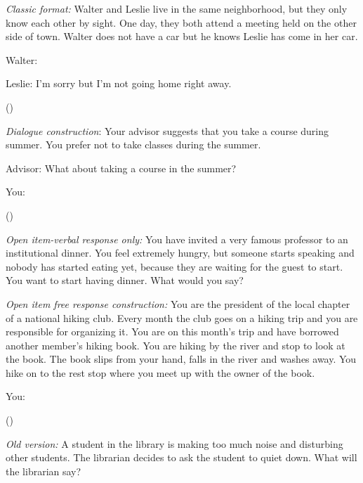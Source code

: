 \documentclass[output=paper]{LSP/langsci}
\begin{document}
\ea
    \label{ex:van:1}
\textit{Classic format:} Walter and Leslie live in the same neighborhood, but they only know each other by sight. One day, they both attend a meeting held on the other side of town. Walter does not have a car but he knows Leslie has come in her car.


Walter: {\longrule\longrule\longrule\longrule\longrule\longrule\longrule}

Leslie: I’m sorry but I’m not going home right away.

  (\citealt{BlumKulka1989})
\z

\ea%
    \label{ex:van:2}
 

          \textit{Dialogue construction}: Your advisor suggests that you take a course during summer. You prefer not to take classes during the summer. 

Advisor: What about taking a course in the summer?

You: {\longrule\longrule\longrule\longrule\longrule\longrule\longrule}

(\citealt{Bardovi-Harlig1993})

    \z
\ea%
    \label{ex:van:3} 
          \textit{Open item-verbal response only:} You have invited a very famous professor to an institutional dinner. You feel extremely hungry, but someone starts speaking and nobody has started eating yet, because they are waiting for the guest to start. You want to start having dinner. What would you say?

\citep{Safont-Jorda2003}

    \z

\ea%
    \label{ex:van:4} 
          \textit{Open item free response construction:} You are the president of the local chapter of a national hiking club. Every month the club goes on a hiking trip and you are responsible for organizing it. You are on this month’s trip and have borrowed another member’s hiking book. You are hiking by the river and stop to look at the book. The book slips from your hand, falls in the river and washes away. You hike on to the rest stop where you meet up with the owner of the book.

You: {\longrule\longrule\longrule\longrule\longrule\longrule\longrule}

(\citealt{Hudson1995})
    \z


\ea%
    \label{ex:van:5} 

          \textit{Old version:} A student in the library is making too much noise and disturbing other students. The librarian decides to ask the student to quiet down. What will the librarian say?
\end{document}
